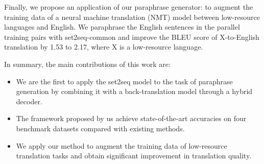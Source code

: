 Finally, we propose an application of our paraphrase generator: 
to augment the training data of 
a neural machine translation (NMT) model between low-resource languages 
and English. 
We paraphrase the English sentences in the parallel training pairs 
with set2seq-common and improve the BLEU score of X-to-English 
translation by 1.53 to 2.17, where X is a low-resource language.

In summary, the main contributions of this work are:
\begin{itemize}
\item We are the first to apply the set2seq model to the task of paraphrase generation by combining it with a back-translation model through a hybrid decoder.
\item The framework proposed by us achieve state-of-the-art accuracies on 
four benchmark datasets compared with existing methods.
\item We apply our method to augment the training data of low-resource
translation tasks and obtain significant improvement in translation quality.
\end{itemize}
